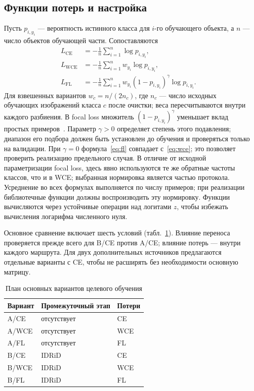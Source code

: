 \documentclass{misisarticle}
\begin{document}
\subsection{Функции потерь и настройка}
Пусть $p_{i,y_i}$ --- вероятность истинного класса для $i$-го обучающего объекта, а $n$ --- число объектов обучающей части. Сопоставляются
\begin{align}
 L_{\mathrm{CE}}&=-\frac1n\sum_{i=1}^{n}\log p_{i,y_i},\label{eq:ce}\\
 L_{\mathrm{WCE}}&=-\frac1n\sum_{i=1}^{n}w_{y_i}\log p_{i,y_i},\label{eq:wce}\\
 L_{\mathrm{FL}}&=-\frac1n\sum_{i=1}^{n}w_{y_i}(1-p_{i,y_i})^\gamma
 \log p_{i,y_i}.\label{eq:fl}
\end{align}
Для взвешенных вариантов $w_c=n/(2n_c)$, где $n_c$ --- число исходных обучающих изображений класса $c$ после очистки; веса пересчитываются внутри каждого разбиения. В focal loss множитель $(1-p_{i,y_i})^\gamma$ уменьшает вклад простых примеров~\cite{focal}. Параметр $\gamma>0$ определяет степень этого подавления; диапазон его подбора должен быть установлен до обучения и проверяться только на валидации. При $\gamma=0$ формула~\eqref{eq:fl} совпадает с~\eqref{eq:wce}; это позволяет проверить реализацию предельного случая. В отличие от исходной параметризации focal loss, здесь явно используются те же обратные частоты классов, что и в WCE; выбранная нормировка является частью протокола. Усреднение во всех формулах выполняется по числу примеров; при реализации библиотечные функции должны воспроизводить эту нормировку. Функции вычисляются через устойчивые операции над логитами $z$, чтобы избежать вычисления логарифма численного нуля.

Основное сравнение включает шесть условий (табл.~\ref{tab:design}). Влияние переноса проверяется прежде всего для B/CE против A/CE; влияние потерь --- внутри каждого маршрута. Для двух дополнительных источников предлагаются отдельные варианты с CE, чтобы не расширять без необходимости основную матрицу.
\begin{table}[htbp]
\centering
\caption{План основных вариантов целевого обучения}
\label{tab:design}
\begin{tabular}{lll}
\toprule
Вариант & Промежуточный этап & Потери \\
\midrule
A/CE & отсутствует & CE \\
A/WCE & отсутствует & WCE \\
A/FL & отсутствует & FL \\
B/CE & IDRiD & CE \\
B/WCE & IDRiD & WCE \\
B/FL & IDRiD & FL \\
\bottomrule
\end{tabular}
\end{table}
\end{document}
